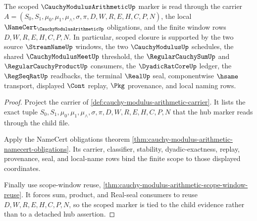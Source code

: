 \begin{theorem}
\label{thm:cauchy-modulus-arithmetic-scoped-evidence-route}
The scoped $\CauchyModulusArithmeticUp$ marker is read through the carrier
$A=(S_0,S_1,\mu_0,\mu_1,\mu_{\wedge},\sigma,\pi,D,W,R,E,H,C,P,N)$, the local
$\NameCert_{\CauchyModulusArithmeticUp}$ obligations, and the finite window rows
$D,W,R,E,H,C,P,N$. In particular, scoped closure is supported by the two source
$\StreamNameUp$ windows, the two $\CauchyModulusUp$ schedules, the shared
$\CauchyModulusMeetUp$ threshold, the $\RegularCauchySumUp$ and
$\RegularCauchyProductUp$ consumers, the $\DyadicRatCoreUp$ ledger, the
$\RegSeqRatUp$ readbacks, the terminal $\RealUp$ seal, componentwise $\hsame$
transport, displayed $\Cont$ replay, $\Pkg$ provenance, and local naming rows.
\end{theorem}
\begin{proof}
Project the carrier of \autoref{def:cauchy-modulus-arithmetic-carrier}. It lists
the exact tuple $S_0,S_1,\mu_0,\mu_1,\mu_{\wedge},\sigma,\pi,D,W,R,E,H,C,P,N$
that the hub marker reads through the child file.

Apply the NameCert obligations theorem
\autoref{thm:cauchy-modulus-arithmetic-namecert-obligations}. Its carrier,
classifier, stability, dyadic-exactness, replay, provenance, seal, and local-name
rows bind the finite scope to those displayed coordinates.

Finally use scope-window reuse,
\autoref{thm:cauchy-modulus-arithmetic-scope-window-reuse}. It forces sum,
product, and Real-seal consumers to reuse $D,W,R,E,H,C,P,N$, so the scoped
marker is tied to the child evidence rather than to a detached hub assertion.
\end{proof}

